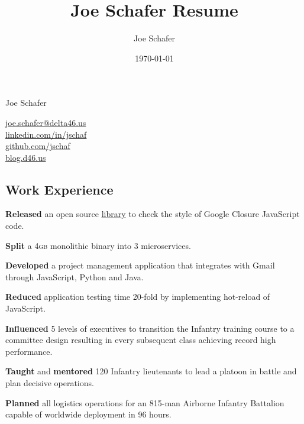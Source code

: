 \documentclass[letterpaper,11pt]{sound-resume}
\title{Joe Schafer Resume}
\author{Joe Schafer}
\date{\today}
\makeatletter
\newcommand*{\emailLink}{\href{mailto:joe.schafer@delta46.us}{joe.schafer@delta46.us}}
\newcommand*{\linkedInLink}{\href{http://linkedin.com/in/jschaf}{linkedin.com/in/jschaf}}
\newcommand*{\githubLink}{\href{http://github.com/jschaf}{github.com/jschaf}}
\newcommand*{\blogLink}{\href{http://blog.d46.us}{blog.d46.us}}
\newcommand*{\action}[1]{\textbf{#1}}
\newcommand*{\GB}{\textsc{gb}}
\makeatother
\begin{document}

\setlength{\columnsep}{3em}

\begin{paracol}{2}
{\fontsize{36px}{48px}\selectfont Joe Schafer}

\switchcolumn
{\fontfamily\sfdefault\selectfont
\emailLink\\
\linkedInLink\\
\githubLink\\
\blogLink\\
}
\end{paracol}


\begin{paracol}{2}
\section*{Work Experience}

\vspace{-12pt}
\begin{workitems}
\item \action{Released} an open source
  \href{https://github.com/google/eslint-closure}{\ul{library}} to check the
  style of Google Closure JavaScript code.
\item \action{Split} a 4\GB{} monolithic binary into 3 microservices.
\item \action{Developed} a project management application that integrates with Gmail
  through JavaScript, Python and Java.
\item \action{Reduced} application testing time 20-fold by implementing hot-reload of JavaScript.
\end{workitems}

\begin{workitems}
\item \action{Influenced} 5 levels of executives to transition the Infantry
  training course to a committee design resulting in every subsequent class
  achieving record high performance.
\item \action{Taught} and \action{mentored} 120 Infantry lieutenants to lead a
  platoon in battle and plan decisive operations.
\end{workitems}

\begin{workitems}
\item \action{Planned} all logistics operations for an 815-man Airborne Infantry
  Battalion capable of worldwide deployment in 96 hours.


\end{workitems}
\end{paracol}
\end{document}
